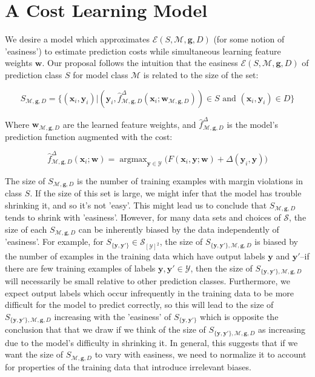 \documentclass{article} %
\DeclareMathOperator*{\argmax}{argmax}
\begin{document}
\section{A Cost Learning Model}
\label{costLearningModel}

We desire a model which approximates 
$\mathcal{E}(S,\mathcal{M},\mathbf{g}, D)$ (for some notion of 
'easiness') to estimate prediction costs while simultaneous learning 
feature weights $\mathbf{w}$.   Our proposal follows the intuition 
that the easiness 
$\mathcal{E}(S,\mathcal{M},\mathbf{g},D)$ of prediction class $S$ for 
model class $\mathcal{M}$ is related to the size of the set:

\begin{equation}
S_{\mathcal{M},\mathbf{g},D}=\{(\textbf{x}_i,\textbf{y}_i) | (\mathbf{y}_i,\hat{f}^\Delta_{\mathcal{M},\mathbf{g},D}(\mathbf{x}_i;\mathbf{w}_{\mathcal{M},\mathbf{g},D}))\in S\text{ and }(\mathbf{x}_i,\mathbf{y}_i)\in D\}
\end{equation}

Where $\mathbf{w}_{\mathcal{M},\mathbf{g},D}$ are the learned feature weights,
and $\hat{f}^\Delta_{\mathcal{M},\mathbf{g},D}$ is the model's prediction
function augmented with the cost:

\begin{equation}
\hat{f}^\Delta_{\mathcal{M},\mathbf{g},D}(\mathbf{x}_i;\mathbf{w})=\argmax_{\mathbf{y}\in\mathcal{Y}}\Big( F(\mathbf{x}_i,\mathbf{y};\mathbf{w})
+\Delta(\mathbf{y}_i,\mathbf{y})\Big)
\end{equation}

The size of $S_{\mathcal{M},\mathbf{g},D}$ is the number of
training examples with margin violations in class $S$. If
the size of this set is large, we might infer that the
model has trouble shrinking it, and so it's not 'easy'.  This 
might lead us to conclude that $S_{\mathcal{M},\mathbf{g},D}$ 
tends to shrink with 'easiness'.  However,
for many data sets and choices of $\mathcal{S}$, the size 
of each $S_{\mathcal{M},\mathbf{g},D}$ can be inherently
biased by the data independently of 'easiness'.  For example, 
for $S_{\{\mathbf{y},\mathbf{y}'\}}\in\mathcal{S}_{[\mathcal{Y}]^2}$, 
the size of $S_{\{\mathbf{y},\mathbf{y}'\},\mathcal{M},\mathbf{g},D}$ 
is biased by the number of examples in the training data which have 
output labels $\mathbf{y}$ and $\mathbf{y}'$--if there are few 
training examples of labels 
$\mathbf{y},\mathbf{y}'\in\mathcal{Y}$, then the size of 
$S_{\{\mathbf{y}, \mathbf{y}'\},\mathcal{M},\mathbf{g},D}$ 
will necessarily be small relative to other prediction classes.
Furthermore, we expect 
output labels which occur infrequently in the training data to 
be more difficult for the model to predict correctly, so this
will lead to the size of 
$S_{\{\mathbf{y},\mathbf{y}'\},\mathcal{M},\mathbf{g},D}$ 
increasing with the 'easiness' of 
$S_{\{\mathbf{y},\mathbf{y}'\}}$ which is opposite the 
conclusion that that we draw if we think of the size of 
$S_{\{\mathbf{y},\mathbf{y}'\},\mathcal{M},\mathbf{g},D}$ as
increasing due to the model's difficulty in shrinking it.  In general, 
this suggests that if we want the size of $S_{\mathcal{M},\mathbf{g},D}$
to vary with easiness, we need to normalize it to account for 
properties of the training data that introduce irrelevant
biases.  
\end{document}
